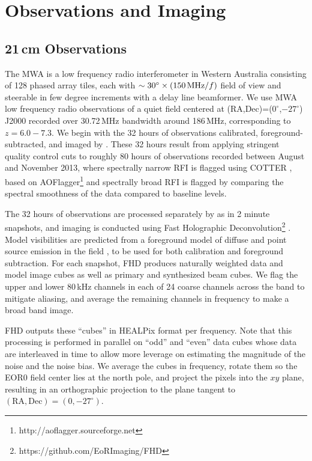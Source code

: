\documentclass[preprint]{aastex}
\begin{document}
\section{Observations and Imaging}
\subsection{21\,cm Observations}

The MWA is a low frequency radio interferometer in Western Australia consisting of 128 phased array tiles, each with $\sim30^\circ\times(150\text{\,MHz}/f)$ field of view and steerable in few degree increments with a delay line beamformer. We use MWA low frequency radio observations of a quiet field centered at (RA,Dec)=($0^\circ$,$-27^\circ$) J2000 recorded over 30.72\,MHz bandwidth around 186\,MHz, corresponding to $z=6.0-7.3$. We begin with the 32 hours of observations calibrated, foreground-subtracted, and imaged by \citet{beardsley16}. These 32 hours result from applying stringent quality control cuts to roughly 80 hours of observations recorded between August and November 2013, where spectrally narrow RFI is flagged using COTTER \citep{AndreMWARFI}, based on AOFlagger\footnote{http://aoflagger.sourceforge.net} \citep{aoflagger} and spectrally broad RFI is flagged by comparing the spectral smoothness of the data compared to baseline levels. 

The 32 hours of observations are processed separately by \citet{beardsley16} as in 2 minute snapshots, and imaging is conducted using Fast Holographic Deconvolution\footnote{https://github.com/EoRImaging/FHD} \citep{fhd}. Model visibilities are predicted from a foreground model of diffuse and point source emission in the field \citep{beardsley16,PattiCatalog1}, to be used for both calibration and foreground subtraction. For each snapshot, FHD produces naturally weighted data and model image cubes as well as primary and synthesized beam cubes. We flag the upper and lower 80\,kHz channels in each of 24 coarse channels across the band to mitigate aliasing, and average the remaining channels in frequency to make a broad band image. 

FHD outputs these ``cubes'' in HEALPix format per frequency. Note that this processing is performed in parallel on ``odd'' and ``even'' data cubes whose data are interleaved in time to allow more leverage on estimating the magnitude of the noise and the noise bias. We average the cubes in frequency, rotate them so the EOR0 field center lies at the north pole, and project the pixels into the $xy$ plane, resulting in an orthographic projection to the plane tangent to  $(\text{RA}, \text{Dec})=(0,-27^\circ)$.
\end{document}
